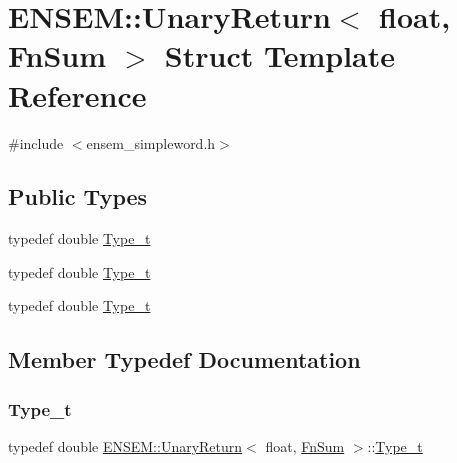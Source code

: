 \hypertarget{structENSEM_1_1UnaryReturn_3_01float_00_01FnSum_01_4}{}\section{E\+N\+S\+EM\+:\+:Unary\+Return$<$ float, Fn\+Sum $>$ Struct Template Reference}
\label{structENSEM_1_1UnaryReturn_3_01float_00_01FnSum_01_4}


{\ttfamily \#include $<$ensem\+\_\+simpleword.\+h$>$}

\subsection*{Public Types}
\begin{DoxyCompactItemize}
\item 
typedef double \mbox{\hyperlink{structENSEM_1_1UnaryReturn_3_01float_00_01FnSum_01_4_a0cb79ec09e03be62cf6790bcbd3d89c3}{Type\+\_\+t}}
\item 
typedef double \mbox{\hyperlink{structENSEM_1_1UnaryReturn_3_01float_00_01FnSum_01_4_a0cb79ec09e03be62cf6790bcbd3d89c3}{Type\+\_\+t}}
\item 
typedef double \mbox{\hyperlink{structENSEM_1_1UnaryReturn_3_01float_00_01FnSum_01_4_a0cb79ec09e03be62cf6790bcbd3d89c3}{Type\+\_\+t}}
\end{DoxyCompactItemize}


\subsection{Member Typedef Documentation}
\mbox{\label{structENSEM_1_1UnaryReturn_3_01float_00_01FnSum_01_4_a0cb79ec09e03be62cf6790bcbd3d89c3}} 
\subsubsection{\texorpdfstring{Type\_t}{Type\_t}\hspace{0.1cm}{\footnotesize\ttfamily [1/3]}}
{\footnotesize\ttfamily typedef double \mbox{\hyperlink{structENSEM_1_1UnaryReturn}{E\+N\+S\+E\+M\+::\+Unary\+Return}}$<$ float, \mbox{\hyperlink{structENSEM_1_1FnSum}{Fn\+Sum}} $>$\+::\mbox{\hyperlink{structENSEM_1_1UnaryReturn_3_01float_00_01FnSum_01_4_a0cb79ec09e03be62cf6790bcbd3d89c3}{Type\+\_\+t}}}

